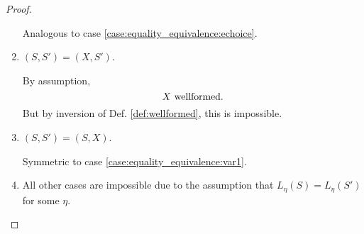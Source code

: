 \documentclass{llncs}
\newcommand*{\wf}[1]{\text{$#1$ {\normalfont \rmfamily wellformed}}}
\renewcommand*{\|}{\;|\;}
\begin{document}
\begin{proof}
\begin{enumerate}
      Analogous to case \ref{case:equality_equivalence:echoice}.

    \item
      \label{case:equality_equivalence:var1}
      $(S, S') = (X, S')$.

      By assumption,
      \begin{equation*}
        \wf{X}.
      \end{equation*}
      But by inversion of Def. \ref{def:wellformed}, this is impossible.

    \item
      \label{case:equality_equivalence:var2}
      $(S, S') = (S, X)$.

      Symmetric to case \ref{case:equality_equivalence:var1}.

    \item
      \label{case:equality_equivalence:other}
      All other cases are impossible due to the assumption that
      $L_\eta(S) = L_\eta(S')$ for some $\eta$.
  \end{enumerate}
\end{proof}
\end{document}
